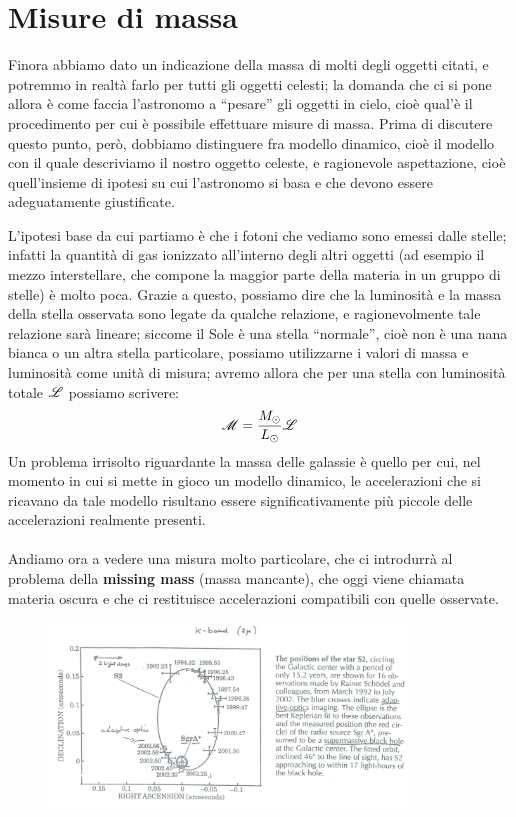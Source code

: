 \section{Misure di massa}

Finora abbiamo dato un indicazione della massa di molti degli oggetti citati, e potremmo in realtà farlo per tutti gli oggetti celesti; la domanda che ci si pone allora è come faccia l'astronomo a ``pesare'' gli oggetti in cielo, cioè qual'è il procedimento per cui è possibile effettuare misure di massa. Prima di discutere questo punto, però, dobbiamo distinguere fra modello dinamico, cioè il modello con il quale descriviamo il nostro oggetto celeste, e ragionevole aspettazione, cioè quell'insieme di ipotesi su cui l'astronomo si basa e che devono essere adeguatamente giustificate.

L'ipotesi base da cui partiamo è che i fotoni che vediamo sono emessi dalle stelle; infatti la quantità di gas ionizzato all'interno degli altri oggetti (ad esempio il mezzo interstellare, che compone la maggior parte della materia in un gruppo di stelle) è molto poca. Grazie a questo, possiamo dire che la luminosità e la massa della stella osservata sono legate da qualche relazione, e ragionevolmente tale relazione sarà lineare; siccome il Sole è una stella ``normale'', cioè non è una nana bianca o un altra stella particolare, possiamo utilizzarne i valori di massa e luminosità come unità di misura; avremo allora che per una stella con luminosità totale $\mathscr{L}$ possiamo scrivere:
$$\mathscr{M}=\frac{M_{\odot}}{L_{\odot}} \mathscr{L}$$
Un problema irrisolto riguardante la massa delle galassie è quello per cui, nel momento in cui si mette in gioco un modello dinamico, le accelerazioni che si ricavano da tale modello risultano essere significativamente più piccole delle accelerazioni realmente presenti.
\\
\\
Andiamo ora a vedere una misura molto particolare, che ci introdurrà al problema della \textbf{missing mass} (massa mancante), che oggi viene chiamata materia oscura e che ci restituisce accelerazioni compatibili con quelle osservate.

\begin{figure}[!h]
\centering
\includegraphics[width=0.85\textwidth]{Img/bertin_21bis.jpg}
\end{figure}

